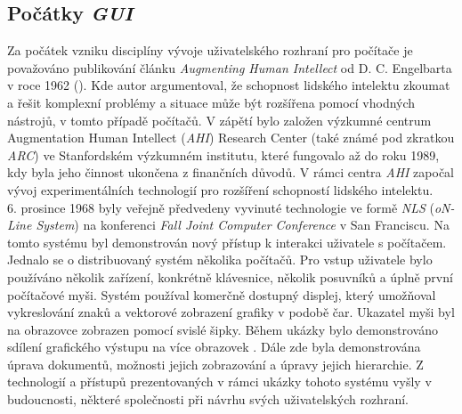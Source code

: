 \documentclass[11pt,twoside,a4paper]{book}
\begin{document}
\subsection{Počátky \textit{GUI}}
Za počátek vzniku disciplíny vývoje uživatelského rozhraní pro počítače je považováno publikování článku \textit{Augmenting Human Intellect} od D. C. Engelbarta v roce 1962 (\cite{bib:AHI}). Kde autor argumentoval, že schopnost lidského intelektu zkoumat a řešit komplexní problémy a situace může být rozšířena pomocí vhodných nástrojů, v tomto případě počítačů. V zápětí bylo založen výzkumné centrum Augmentation Human Intellect (\textit{AHI}) Research Center (také známé pod zkratkou \textit{ARC}) ve Stanfordském výzkumném institutu, které fungovalo až do roku 1989, kdy byla jeho činnost ukončena z finančních důvodů. V rámci centra \textit{AHI} započal vývoj experimentálních technologií pro rozšíření schopností lidského intelektu.\\
6. prosince 1968 byly veřejně předvedeny vyvinuté technologie ve formě \textit{NLS} (\textit{oN-Line System}) na konferenci \textit{Fall Joint Computer Conference} v San Franciscu. Na tomto systému byl demonstrován nový přístup k interakci uživatele s počítačem. Jednalo se o distribuovaný systém několika počítačů. Pro vstup uživatele bylo používáno několik zařízení, konkrétně klávesnice, několik posuvníků a úplně první počítačové myši. Systém používal komerčně dostupný displej, který umožňoval vykreslování znaků a vektorové zobrazení grafiky v podobě čar. Ukazatel myši byl na obrazovce zobrazen pomocí svislé šipky. Během ukázky bylo demonstrováno sdílení grafického výstupu na více obrazovek . Dále zde byla demonstrována úprava dokumentů, možnosti jejich zobrazování a úpravy jejich hierarchie. Z technologií a přístupů prezentovaných v rámci ukázky tohoto systému vyšly v budoucnosti, některé společnosti při návrhu svých uživatelských rozhraní.\cite{bib:aug}\\
\end{document}
